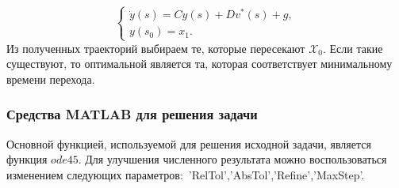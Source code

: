 \documentclass[11pt]{article}
\begin{document}
	\[\begin{cases}
	\dot y(s) = Cy(s) + Dv^*(s) + g,\\
	y(s_0) = x_1.
	\end{cases} \]
	{Из полученных траекторий выбираем те, которые пересекают $\mathcal{X}_0$. Если такие существуют, то оптимальной является та, которая соответствует минимальному времени перехода. }
	{\subsubsection{Средства MATLAB для решения задачи}}
	{Основной функцией, используемой для решения исходной задачи, является функция $ode45$. Для улучшения численного результата можно воспользоваться изменением следующих параметров:\ 'RelTol','AbsTol','Refine','MaxStep'.}
	
	\newpage
	
\end{document}
